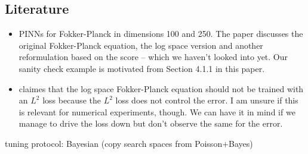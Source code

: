 \subsection{Literature}
\begin{itemize}
    \item \cite{hu2024score} PINNs for Fokker-Planck in dimensions 100 and 250. The paper discusses the original Fokker-Planck equation, the log space version and another reformulation based on the score -- which we haven't looked into yet. Our sanity check example is motivated from Section 4.1.1 in this paper. 
    \item \cite{wang20222} claimes that the log space Fokker-Planck equation should not be trained with an $L^2$ loss because the $L^2$ loss does not control the error. I am unsure if this is relevant for numerical experiments, though. We can have it in mind if we manage to drive the loss down but don't observe the same for the error. 
\end{itemize}

 tuning protocol: Bayesian (copy search spaces from Poisson+Bayes)
